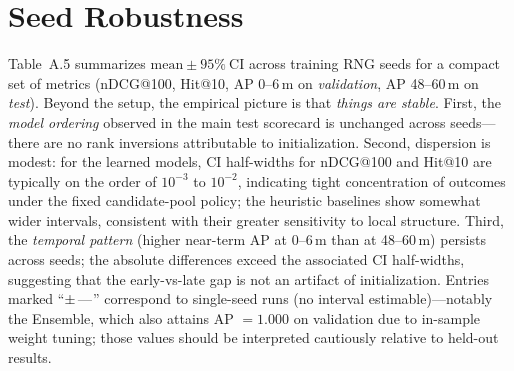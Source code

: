 \section{Seed Robustness}
\label{app:a5-seeds}
\noindent
\noindent
Table~A.5 summarizes \(\text{mean} \pm 95\%\ \text{CI}\) across training RNG seeds for a compact set of metrics (nDCG@100, Hit@10, AP 0--6\,m on \textit{validation}, AP 48--60\,m on \textit{test}). Beyond the setup, the empirical picture is that \emph{things are stable}. First, the \emph{model ordering} observed in the main test scorecard is unchanged across seeds---there are no rank inversions attributable to initialization. Second, dispersion is modest: for the learned models, CI half-widths for nDCG@100 and Hit@10 are typically on the order of \(10^{-3}\) to \(10^{-2}\), indicating tight concentration of outcomes under the fixed candidate-pool policy; the heuristic baselines show somewhat wider intervals, consistent with their greater sensitivity to local structure. Third, the \emph{temporal pattern} (higher near-term AP at 0--6\,m than at 48--60\,m) persists across seeds; the absolute differences exceed the associated CI half-widths, suggesting that the early-vs-late gap is not an artifact of initialization. Entries marked ``\(\pm\,\NA\)'' correspond to single-seed runs (no interval estimable)---notably the Ensemble, which also attains AP \(=1.000\) on validation due to in-sample weight tuning; those values should be interpreted cautiously relative to held-out results.


\begin{table}[h]
  \centering
  \caption[\textit{Seed Robustness (test; mean $\pm$ 95\% CI)}]{\textit{Seed Robustness (mean $\pm$ 95\% CI)}}
  \label{tab:seed_robustness}

\resizebox{\linewidth}{!}{}

  \captionsetup{justification=raggedright,singlelinecheck=false}
  \caption*{\footnotesize \textit{Note}. Entries report \emph{mean $\pm$ 95\% confidence interval} across training seeds for each model; the number of seeds used is shown in the $n_{\text{seeds}}$ column. 
  nDCG@100 and Hit@10 are computed on the held-out \textit{test} window (2022-02-09 to 2025-06-09). 
  Horizon metrics are calendar-anchored: AP 0--6\,m is evaluated on \textit{validation} (anchored from $T_0$ end), while AP 48--60\,m is evaluated on \textit{test}. 
  $\pm\,\NA$ indicates \emph{single-seed} runs (no interval estimable). 
  Candidate pools follow the same policy as Table~\ref{tab:model_scorecard} (undirected two-hop with uniform fallback, per-source budget 5{,}000; earlier positives excluded); labels are positive\text{--}unlabeled, so precision-like metrics are lower bounds.}
\end{table}

\FloatBarrier   %


